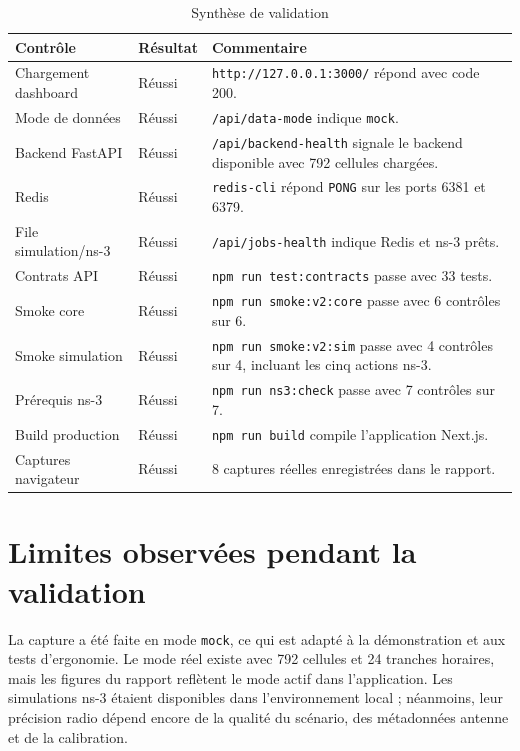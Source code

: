 \documentclass[12pt,a4paper,oneside]{report}
\begin{document}
\begin{table}[H]
\centering
\caption{Synthèse de validation}
\label{tab:validation}
\begin{tabularx}{\textwidth}{p{4.4cm}p{3cm}X}
\toprule
\textbf{Contrôle} & \textbf{Résultat} & \textbf{Commentaire} \\
\midrule
Chargement dashboard & Réussi & \texttt{http://127.0.0.1:3000/} répond avec code 200. \\
Mode de données & Réussi & \texttt{/api/data-mode} indique \texttt{mock}. \\
Backend FastAPI & Réussi & \texttt{/api/backend-health} signale le backend disponible avec 792 cellules chargées. \\
Redis & Réussi & \texttt{redis-cli} répond \texttt{PONG} sur les ports 6381 et 6379. \\
File simulation/ns-3 & Réussi & \texttt{/api/jobs-health} indique Redis et ns-3 prêts. \\
Contrats API & Réussi & \texttt{npm run test:contracts} passe avec 33 tests. \\
Smoke core & Réussi & \texttt{npm run smoke:v2:core} passe avec 6 contrôles sur 6. \\
Smoke simulation & Réussi & \texttt{npm run smoke:v2:sim} passe avec 4 contrôles sur 4, incluant les cinq actions ns-3. \\
Prérequis ns-3 & Réussi & \texttt{npm run ns3:check} passe avec 7 contrôles sur 7. \\
Build production & Réussi & \texttt{npm run build} compile l'application Next.js. \\
Captures navigateur & Réussi & 8 captures réelles enregistrées dans le rapport. \\
\bottomrule
\end{tabularx}
\end{table}

\section{Limites observées pendant la validation}
La capture a été faite en mode \texttt{mock}, ce qui est adapté à la démonstration et aux tests d'ergonomie. Le mode réel existe avec 792 cellules et 24 tranches horaires, mais les figures du rapport reflètent le mode actif dans l'application. Les simulations ns-3 étaient disponibles dans l'environnement local ; néanmoins, leur précision radio dépend encore de la qualité du scénario, des métadonnées antenne et de la calibration.
\end{document}
